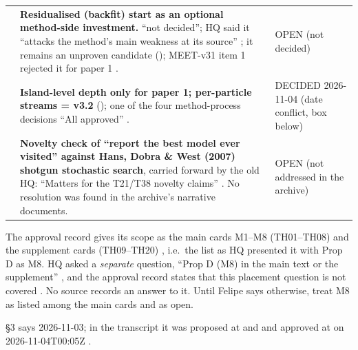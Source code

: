 {\begin{xltabular}{\textwidth}{@{}>{\raggedright\arraybackslash}p{1.3cm}>{\raggedright\arraybackslash}X >{\raggedright\arraybackslash}p{2.6cm}@{}}
 & \textbf{Residualised (backfit) start as an optional method-side investment.} ``not decided''; HQ said it ``attacks the method's main weakness at its source'' ; it remains an unproven candidate (); MEET-v31 item 1 rejected it for paper 1 . & OPEN (not decided) \\
 & \textbf{Island-level depth only for paper 1; per-particle streams = v3.2} (); one of the four method-process decisions ``All approved''  . & DECIDED 2026-11-04 (date conflict, box below) \\
 & \textbf{Novelty check of ``report the best model ever visited'' against Hans, Dobra \& West (2007) shotgun stochastic search}, carried forward by the old HQ: ``Matters for the T21/T38 novelty claims'' . No resolution was found in the archive's narrative documents. & OPEN (not addressed in the archive) \\
\bottomrule
\end{xltabular}
}

\begin{uncertain}
The approval record gives its scope as the main cards M1--M8 (TH01--TH08) and the supplement cards (TH09--TH20) , i.e.\ the list as HQ presented it with Prop D as M8. HQ asked a \emph{separate} question, ``Prop D (M8) in the main text or the supplement'' , and the approval record states that this placement question is not covered . No source records an answer to it. Until Felipe says otherwise, treat M8 as listed among the main cards and  as open.
\end{uncertain}
\begin{uncertain}
 §3 says 2026-11-03; in the transcript it was proposed at  and  and approved at  on 2026-11-04T00:05Z .
\end{uncertain}

